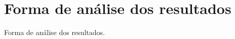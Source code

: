 \chapter[Forma de análise dos resultados]{Forma de análise dos resultados}\label{FormaAnaliseResultados}

Forma de análise dos resultados.





  

  
